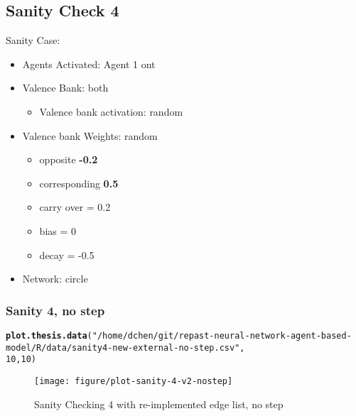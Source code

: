 \documentclass{article}\usepackage[]{graphicx}\usepackage[]{color}
\makeatletter
\def\maxwidth{ %
  \ifdim\Gin@nat@width>\linewidth
    \linewidth
  \else
    \Gin@nat@width
  \fi
}
\newcommand{\hlnum}[1]{\textcolor[rgb]{0.686,0.059,0.569}{#1}}%
\newcommand{\hlstr}[1]{\textcolor[rgb]{0.192,0.494,0.8}{#1}}%
\newcommand{\hlstd}[1]{\textcolor[rgb]{0.345,0.345,0.345}{#1}}%
\newcommand{\hlkwd}[1]{\textcolor[rgb]{0.737,0.353,0.396}{\textbf{#1}}}%
\newenvironment{kframe}{%
 \def\at@end@of@kframe{}%
 \ifinner\ifhmode%
  \def\at@end@of@kframe{\end{minipage}}%
  \begin{minipage}{\columnwidth}%
 \fi\fi%
 \def\FrameCommand##1{\hskip\@totalleftmargin \hskip-\fboxsep
 \colorbox{shadecolor}{##1}\hskip-\fboxsep
     \hskip-\linewidth \hskip-\@totalleftmargin \hskip\columnwidth}%
 \MakeFramed {\advance\hsize-\width
   \@totalleftmargin\z@ \linewidth\hsize
   \@setminipage}}%
 {\par\unskip\endMakeFramed%
 \at@end@of@kframe}
\newenvironment{knitrout}{}{} %
\makeatother
\begin{document}
\newpage
\subsection{Sanity Check 4}
\label{sec:sanity4}
Sanity Case:
\begin{itemize}
  \item Agents Activated: Agent 1 ont
  \item Valence Bank: both
  \begin{itemize}
      \item Valence bank activation: random
  \end{itemize}
  \item Valence bank Weights: random
  \begin{itemize}
      \item opposite \textbf{-0.2}
      \item corresponding \textbf{0.5}
      \item carry over = 0.2
      \item bias = 0
      \item decay = -0.5
  \end{itemize}
  \item Network: circle
\end{itemize}
%
%

\newpage
\subsubsection{Sanity 4, no step}
\begin{knitrout}
\color{fgcolor}\begin{kframe}
\begin{alltt}
\hlkwd{plot.thesis.data}\hlstd{(}\hlstr{"/home/dchen/git/repast-neural-network-agent-based-model/R/data/sanity4-new-external-no-step.csv"}\hlstd{,}
    \hlnum{10}\hlstd{,} \hlnum{10}\hlstd{)}
\end{alltt}
\end{kframe}\begin{figure}[]

\texttt{[image: figure/plot-sanity-4-v2-nostep]} \caption[Sanity Checking 4 with re-implemented edge list, no step]{Sanity Checking 4 with re-implemented edge list, no step\label{fig:plot-sanity-4-v2-nostep}}
\end{figure}


\end{knitrout}
\end{document}
